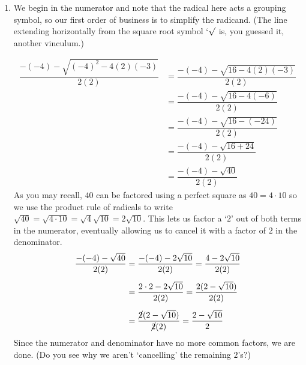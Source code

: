 {
\begin{enumerate}

\item  We begin in the numerator and note that the radical here acts a grouping symbol,  so our first order of business is to simplify the radicand. (The line extending horizontally from the square root symbol `$\sqrt{\vphantom{2}}$ is, you guessed it, another vinculum.)

\begin{align*}
\dfrac{-(-4) -\sqrt{(-4)^2-4(2)(-3)}}{2(2)}  & =  \dfrac{-(-4) - \sqrt{16-4(2)(-3)}}{2(2)}  \\[5pt]                                           
 & =  \dfrac{-(-4) - \sqrt{16-4(-6)}}{2(2)} \\[5pt]
 & =  \dfrac{-(-4) - \sqrt{16-(-24)}}{2(2)}  \\[5pt]
 & =  \dfrac{-(-4) - \sqrt{16+24}}{2(2)}  \\[5pt]
 & =  \dfrac{-(-4) - \sqrt{40}}{2(2)} 
\end{align*}
As you may recall, $40$ can be factored using a perfect square as $40 = 4 \cdot 10$ so we use the product rule of radicals to write $\sqrt{40} = \sqrt{4 \cdot 10} = \sqrt{4} \sqrt{10} = 2 \sqrt{10}$.  This lets us factor a `$2$' out of both terms in the numerator, eventually allowing us to cancel it with a factor of $2$ in the denominator.
\begin{align*}
 \dfrac{-(-4) - \sqrt{40}}{2(2)} & =   \dfrac{-(-4) - 2\sqrt{10}}{2(2)}       =   \dfrac{4  - 2\sqrt{10}}{2(2)} \\[5pt] 
   & =   \dfrac{2 \cdot 2  - 2\sqrt{10}}{2(2)}  =   \dfrac{2(2  - \sqrt{10})}{2(2)} \\[5pt] 
	& =   \dfrac{\cancel{2}(2  - \sqrt{10})}{\cancel{2}(2)}  =   \dfrac{2  - \sqrt{10}}{2}
\end{align*}
Since the numerator and denominator have no more common factors, we are done. (Do you see why we aren't `cancelling' the remaining $2$'s?)

\drawexampleline


\end{enumerate}}
